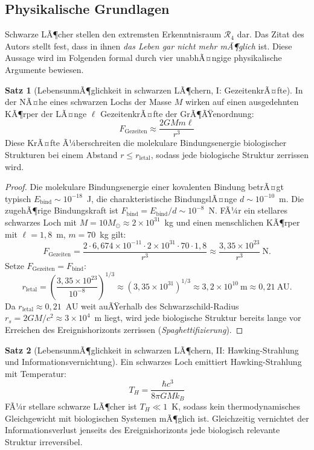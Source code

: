 ﻿\documentclass[a4paper,12pt]{article}
\theoremstyle{definition}
\newtheorem{satz}{Satz}
\begin{document}
\subsection{Physikalische Grundlagen}

Schwarze LÃ¶cher stellen den extremsten Erkenntnisraum $\mathcal{R}_4$ dar.
Das Zitat des Autors stellt fest, dass in ihnen \emph{das Leben gar nicht mehr
mÃ¶glich} ist. Diese Aussage wird im Folgenden formal durch vier unabhÃ¤ngige
physikalische Argumente bewiesen.

\begin{satz}[LebensunmÃ¶glichkeit in schwarzen LÃ¶chern, I: GezeitenkrÃ¤fte]
\label{satz:gezeiten}
    In der NÃ¤he eines schwarzen Lochs der Masse $M$ wirken auf einen
    ausgedehnten KÃ¶rper der LÃ¤nge $\ell$ GezeitenkrÃ¤fte der GrÃ¶ÃŸenordnung:
    \[
        F_{\text{Gezeiten}} \approx \frac{2GM m \ell}{r^3}
    \]
    Diese KrÃ¤fte Ã¼berschreiten die molekulare Bindungsenergie biologischer
    Strukturen bei einem Abstand $r \leq r_{\text{letal}}$, sodass jede
    biologische Struktur zerrissen wird.
\end{satz}

\begin{proof}
    Die molekulare Bindungsenergie einer kovalenten Bindung betrÃ¤gt typisch
    $E_{\text{bind}} \sim 10^{-18}$~J, die charakteristische BindungslÃ¤nge
    $d \sim 10^{-10}$~m. Die zugehÃ¶rige Bindungskraft ist
    $F_{\text{bind}} = E_{\text{bind}}/d \sim 10^{-8}$~N.
    FÃ¼r ein stellares schwarzes Loch mit $M = 10 M_\odot \approx 2 \times 10^{31}$~kg
    und einen menschlichen KÃ¶rper mit $\ell = 1{,}8$~m, $m = 70$~kg gilt:
    \[
        F_{\text{Gezeiten}} = \frac{2 \cdot 6{,}674\times10^{-11} \cdot 2\times10^{31}
        \cdot 70 \cdot 1{,}8}{r^3}
        \approx \frac{3{,}35 \times 10^{23}}{r^3}~\text{N}.
    \]
    Setze $F_{\text{Gezeiten}} = F_{\text{bind}}$:
    \[
        r_{\text{letal}} = \left(\frac{3{,}35 \times 10^{23}}{10^{-8}}\right)^{1/3}
        \approx \left(3{,}35 \times 10^{31}\right)^{1/3}
        \approx 3{,}2 \times 10^{10}~\text{m} \approx 0{,}21~\text{AU}.
    \]
    Da $r_{\text{letal}} \approx 0{,}21$~AU weit auÃŸerhalb des Schwarzschild-Radius
    $r_s = 2GM/c^2 \approx 3 \times 10^4$~m liegt, wird jede biologische Struktur
    bereits lange vor Erreichen des Ereignishorizonts zerrissen (\emph{Spaghettifizierung}).
    \qedhere
\end{proof}

\begin{satz}[LebensunmÃ¶glichkeit in schwarzen LÃ¶chern, II: Hawking-Strahlung und Informationsvernichtung]
\label{satz:hawking}
    Ein schwarzes Loch emittiert Hawking-Strahlung mit Temperatur:
    \[
        T_H = \frac{\hbar c^3}{8 \pi G M k_B}
    \]
    FÃ¼r stellare schwarze LÃ¶cher ist $T_H \ll 1$~K, sodass kein
    thermodynamisches Gleichgewicht mit biologischen Systemen mÃ¶glich ist.
    Gleichzeitig vernichtet der Informationsverlust jenseits des
    Ereignishorizonts jede biologisch relevante Struktur irreversibel.
\end{satz}
\end{document}
